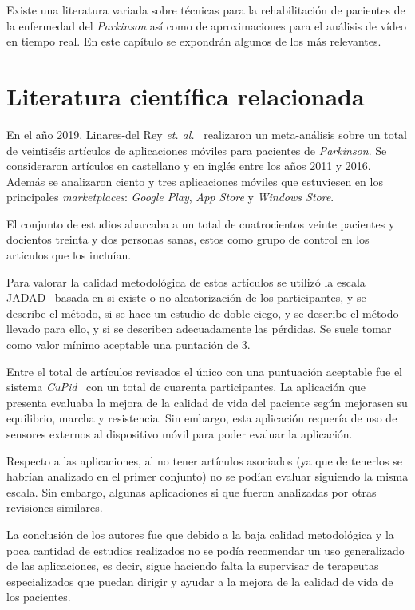 
Existe una literatura variada sobre técnicas para la rehabilitación de pacientes de la enfermedad del \textit{Parkinson} así como de aproximaciones para el análisis de vídeo en tiempo real. En este capítulo se expondrán algunos de los más relevantes.

\section{Literatura científica relacionada}

En el año 2019, Linares-del Rey \textit{et. al.}~\cite{linares2019aplicaciones} realizaron un meta-análisis sobre un total de veintiséis artículos de aplicaciones móviles para pacientes de \textit{Parkinson}. Se consideraron artículos en castellano y en inglés entre los años 2011 y 2016. Además se analizaron ciento y tres aplicaciones móviles que estuviesen en los principales \textit{marketplaces}: \textit{Google Play}, \textit{App Store} y \textit{Windows Store}.

El conjunto de estudios abarcaba a un total de cuatrocientos veinte pacientes y docientos treinta y dos personas sanas, estos como grupo de control en los artículos que los incluían. 

Para valorar la calidad metodológica de estos artículos se utilizó la escala JADAD~\cite{jadad1996assessing} basada en si existe o no aleatorización de los participantes, y se describe el método, si se hace un estudio de doble ciego, y se describe el método llevado para ello, y si se describen adecuadamente las pérdidas. Se suele tomar como valor mínimo aceptable una puntación de 3.

Entre el total de artículos revisados el único con una puntuación aceptable fue el sistema \textit{CuPid}~\cite{ginis2016feasibility} con un total de cuarenta participantes. La aplicación que presenta evaluaba la mejora de la calidad de vida del paciente según mejorasen su equilibrio, marcha y resistencia. Sin embargo, esta aplicación requería de uso de sensores externos al dispositivo móvil para poder evaluar la aplicación.

Respecto a las aplicaciones, al no tener artículos asociados (ya que de tenerlos se habrían analizado en el primer conjunto) no se podían evaluar siguiendo la misma escala. Sin embargo, algunas aplicaciones si que fueron analizadas por otras revisiones similares.

La conclusión de los autores fue que debido a la baja calidad metodológica y la poca cantidad de estudios realizados no se podía recomendar un uso generalizado de las aplicaciones, es decir, sigue haciendo falta la supervisar de terapeutas especializados que puedan dirigir y ayudar a la mejora de la calidad de vida de los pacientes.

